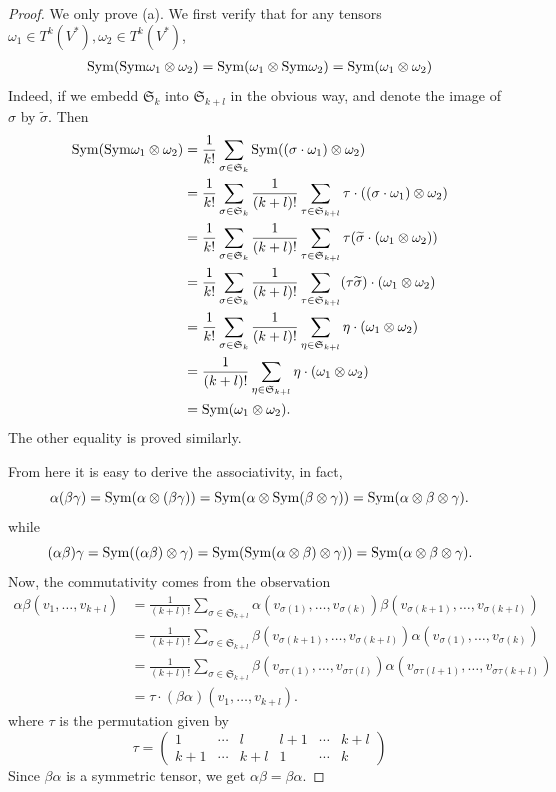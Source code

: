 \begin{proof}
We only prove (a). We first verify that for any tensors $\omega_1\in T^k(V^*),\omega_2\in T^k(V^*)$,
\begin{align}\label{symmetric product}
\mathrm{Sym}(\mathrm{Sym}\omega_1\otimes\omega_2)=\mathrm{Sym}(\omega_1\otimes\mathrm{Sym}\omega_2)=\mathrm{Sym}(\omega_1\otimes\omega_2)
\end{align}
Indeed, if we embedd $\mathfrak{S}_k$ into $\mathfrak{S}_{k+l}$ in the obvious way, and denote the image of $\sigma$ by $\widetilde{\sigma}$. Then
\begin{align*}
\mathrm{Sym}(\mathrm{Sym}\omega_1\otimes\omega_2)&=\frac{1}{k!}\sum_{\sigma\in\mathfrak{S}_k}\mathrm{Sym}((\sigma\cdot\omega_1)\otimes\omega_2)\\
&=\frac{1}{k!}\sum_{\sigma\in\mathfrak{S}_k}\frac{1}{(k+l)!}\sum_{\tau\in\mathfrak{S}_{k+l}}\tau\cdot((\sigma\cdot\omega_1)\otimes\omega_2)\\
&=\frac{1}{k!}\sum_{\sigma\in\mathfrak{S}_k}\frac{1}{(k+l)!}\sum_{\tau\in\mathfrak{S}_{k+l}}\tau(\widetilde{\sigma}\cdot(\omega_1\otimes\omega_2))\\
&=\frac{1}{k!}\sum_{\sigma\in\mathfrak{S}_k}\frac{1}{(k+l)!}\sum_{\tau\in\mathfrak{S}_{k+l}}(\tau\widetilde{\sigma})\cdot(\omega_1\otimes\omega_2)\\
&=\frac{1}{k!}\sum_{\sigma\in\mathfrak{S}_k}\frac{1}{(k+l)!}\sum_{\eta\in\mathfrak{S}_{k+l}}\eta\cdot(\omega_1\otimes\omega_2)\\
&=\frac{1}{(k+l)!}\sum_{\eta\in\mathfrak{S}_{k+l}}\eta\cdot(\omega_1\otimes\omega_2)\\
&=\mathrm{Sym}(\omega_1\otimes\omega_2).
\end{align*}
The other equality is proved similarly.\par
From here it is easy to derive the associativity, in fact,
\[\alpha(\beta\gamma)=\mathrm{Sym}(\alpha\otimes(\beta\gamma))=\mathrm{Sym}(\alpha\otimes\mathrm{Sym}(\beta\otimes\gamma))=\mathrm{Sym}(\alpha\otimes\beta\otimes\gamma).\]
while
\[(\alpha\beta)\gamma=\mathrm{Sym}((\alpha\beta)\otimes\gamma)=\mathrm{Sym}(\mathrm{Sym}(\alpha\otimes\beta)\otimes\gamma))=\mathrm{Sym}(\alpha\otimes\beta\otimes\gamma).\]
Now, the commutativity comes from the observation 
\begin{align*}
\alpha\beta(v_1,\dots,v_{k+l})&=\frac{1}{(k+l)!}\sum_{\sigma\in\mathfrak{S}_{k+l}}\alpha(v_{\sigma(1)},\dots,v_{\sigma(k)})\beta(v_{\sigma(k+1)},\dots,v_{\sigma(k+l)})\\
&=\frac{1}{(k+l)!}\sum_{\sigma\in\mathfrak{S}_{k+l}}\beta(v_{\sigma(k+1)},\dots,v_{\sigma(k+l)})\alpha(v_{\sigma(1)},\dots,v_{\sigma(k)})\\
&=\frac{1}{(k+l)!}\sum_{\sigma\in\mathfrak{S}_{k+l}}\beta(v_{\sigma\tau(1)},\dots,v_{\sigma\tau(l)})\alpha(v_{\sigma\tau(l+1)},\dots,v_{\sigma\tau(k+l)})\\
&=\tau\cdot(\beta\alpha)(v_1,\dots,v_{k+l}).
\end{align*}
where $\tau$ is the permutation given by
\[\tau=\begin{pmatrix}
1&\cdots&l&l+1&\cdots&k+l\\
k+1&\cdots&k+l&1&\cdots&k
\end{pmatrix}\]
Since $\beta\alpha$ is a symmetric tensor, we get $\alpha\beta=\beta\alpha$.
\end{proof}
